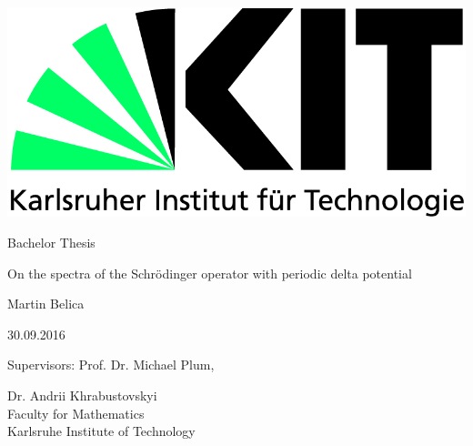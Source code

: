 \begin{titlepage}
  \includegraphics[scale=0.45]{kit-logo.jpg}
  \vspace*{2cm} 

  \begin{center} \large 
    
    Bachelor Thesis
    \vspace*{2cm}

    {\huge On the spectra of the Schrödinger operator with periodic delta potential}
    \vspace*{2.5cm}

    Martin Belica
    \vspace*{0.125cm}

    30.09.2016
    \vspace*{4.25cm}


    Supervisors: Prof. Dr. Michael Plum,
    \vspace*{0.125cm}
    
    Dr. Andrii Khrabustovskyi \\[1cm]
    Faculty for Mathematics \\[1cm]
	Karlsruhe Institute of Technology
  \end{center}
\end{titlepage}